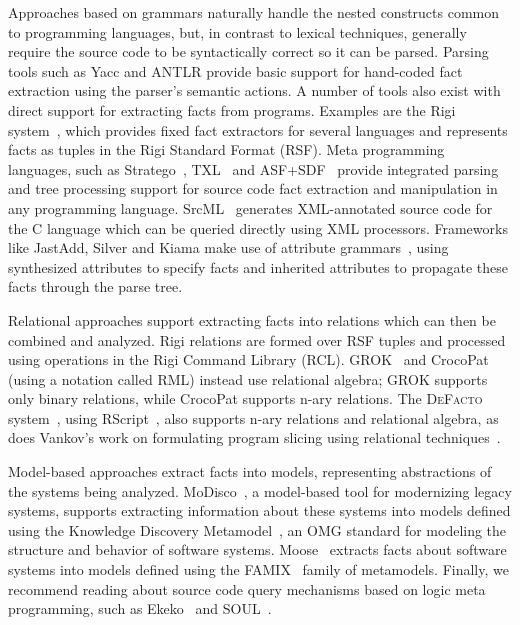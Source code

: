 \documentclass[conference]{IEEEtran}
\newcommand{\Rascal}{\textsc{Rascal}}
\newcommand{\DeFacto}{\textsc{DeFacto}\xspace}
\begin{document}
Approaches based on grammars naturally handle the nested constructs common to
programming languages, but, in contrast to lexical techniques, generally
require the source code to be syntactically correct so it can be parsed.
Parsing tools such as Yacc and ANTLR provide basic support for hand-coded
fact extraction using the parser's semantic actions. A number of tools also
exist with direct support for extracting facts from programs. Examples are
the Rigi system~\cite{Mueller88}, which provides fixed fact extractors for
several languages and represents facts as tuples in the Rigi Standard Format
(RSF). Meta programming languages, such as Stratego~\cite{BKVV06}, TXL~\cite{TXL06} and ASF+SDF~\cite{BDHJJKKMOSVVV01} provide integrated parsing and tree processing support for source code fact extraction and manipulation in any programming language. SrcML~\cite{srcml} generates XML-annotated source code for the C language which can be queried directly using XML processors. 
Frameworks like JastAdd, Silver and Kiama make use of attribute
grammars~\cite{FNC2,Paakki95,EkmanHedin07,kiama,DBLP:journals/scp/WykBGK10},
using synthesized attributes to specify facts and inherited attributes to
propagate these facts through the parse tree.

Relational approaches support extracting facts into relations which can then
be combined and analyzed. Rigi relations are formed over RSF tuples and
processed using operations in the Rigi Command Library (RCL).
GROK~\cite{Holt96} and CrocoPat~\cite{BeyerEtAl03,beyer05efficient} (using a
notation called RML) instead use relational algebra; GROK supports only binary
relations, while CrocoPat supports n-ary relations. The \DeFacto
system~\cite{DBLP:conf/sle/BastenK08}, using RScript~\cite{KlintRscript}, also
supports n-ary relations and relational algebra, as does Vankov's work on
formulating program slicing using relational techniques~\cite{Vankov05}.

Model-based approaches extract facts into models, representing abstractions of
the systems being analyzed. MoDisco~\cite{DBLP:journals/infsof/BruneliereCDM14,DBLP:conf/kbse/BruneliereCJM10},
a model-based tool for modernizing legacy
systems, supports extracting information about these systems into models
defined using the Knowledge Discovery Metamodel~\cite{omg-kdm}, an OMG
standard for modeling the structure and behavior of software systems. 
Moose~\cite{DBLP:conf/sigsoft/NierstraszDG05,DBLP:journals/sigsoft/Nierstrasz12}
extracts facts about software systems into models defined using the FAMIX~\cite{famix}
family of metamodels. Finally, we recommend reading about source code query mechanisms based on logic meta programming, such as Ekeko~\cite{ekeko} and SOUL~\cite{soul}.
\end{document}
